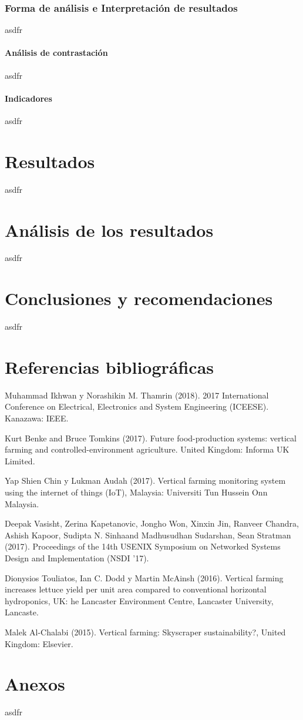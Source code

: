 \documentclass{report}
\begin{document}
\subsection{Forma de análisis e Interpretación de resultados}
asdfr
\subsubsection{Análisis de contrastación}
asdfr
\subsubsection{Indicadores}
asdfr
\chapter{Resultados}
asdfr
\chapter{Análisis de los resultados}
asdfr
\chapter{Conclusiones y recomendaciones}
asdfr
\chapter{Referencias bibliográficas}
Muhammad Ikhwan y Norashikin M. Thamrin (2018). 2017 International Conference on
Electrical, Electronics and System Engineering (ICEESE). Kanazawa: IEEE.

Kurt Benke and Bruce Tomkins (2017). Future food-production systems: vertical
farming and controlled-environment agriculture. United Kingdom: Informa UK
Limited.

Yap Shien Chin y Lukman Audah (2017). Vertical farming monitoring system using
the internet of things (IoT), Malaysia: Universiti Tun Hussein Onn Malaysia.

Deepak Vasisht, Zerina Kapetanovic, Jongho Won, Xinxin Jin, Ranveer Chandra,
Ashish Kapoor, Sudipta N. Sinhaand Madhusudhan Sudarshan, Sean Stratman (2017).
Proceedings of the 14th USENIX Symposium on Networked Systems Design and
Implementation (NSDI ’17).

Dionysios Touliatos, Ian C. Dodd y Martin McAinsh (2016). Vertical farming
increases lettuce yield per unit area compared to conventional horizontal
hydroponics, UK: he Lancaster Environment Centre, Lancaster University,
Lancaste.

Malek Al-Chalabi (2015). Vertical farming: Skyscraper sustainability?, United
Kingdom: Elsevier.
\chapter{Anexos}
asdfr
\end{document}
